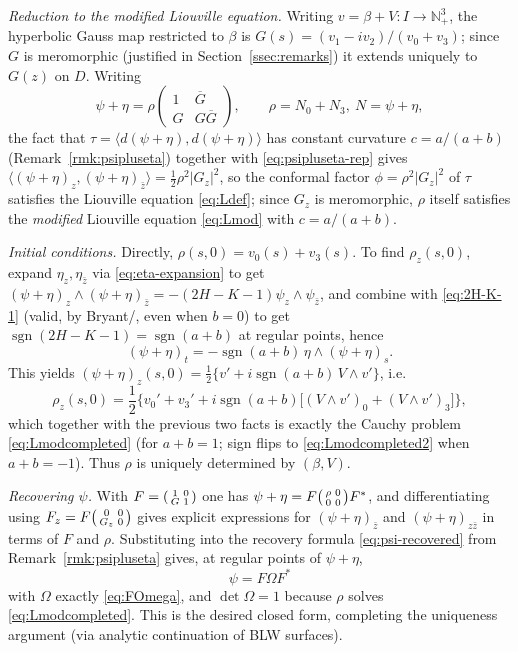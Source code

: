 \documentclass[11pt,a4paper]{article}
\newcommand{\LCone}{\mathbb{N}^3_+}                  %
\newcommand{\ip}[2]{\langle #1,#2\rangle}            %
\newcommand{\sgn}{\operatorname{sgn}}
\theoremstyle{plain}
\theoremstyle{definition}
\theoremstyle{remark}
\begin{document}
\emph{Reduction to the modified Liouville equation.} Writing
$v=\beta+V:I\to\LCone$, the hyperbolic Gauss map restricted to $\beta$ is
$G(s)=(v_1-iv_2)/(v_0+v_3)$; since $G$ is meromorphic (justified in
Section~\ref{ssec:remarks}) it extends uniquely to $G(z)$ on $D$. Writing
\begin{equation}\label{eq:psipluseta-rep}
  \psi+\eta = \rho\begin{pmatrix}1&\overline G\\ G&G\overline G\end{pmatrix},
  \qquad \rho=N_0+N_3,\ N=\psi+\eta,
\end{equation}
the fact that $\tau=\ip{d(\psi+\eta)}{d(\psi+\eta)}$ has constant
curvature $c=a/(a+b)$ (Remark~\ref{rmk:psipluseta}) together with
\eqref{eq:psipluseta-rep} gives $\ip{(\psi+\eta)_z}{(\psi+\eta)_{\bar z}}
=\tfrac12\rho^2|G_z|^2$, so the conformal factor $\phi=\rho^2|G_z|^2$ of
$\tau$ satisfies the Liouville equation \eqref{eq:Ldef}; since $G_z$ is
meromorphic, $\rho$ itself satisfies the \emph{modified} Liouville
equation \eqref{eq:Lmod} with $c=a/(a+b)$.

\emph{Initial conditions.} Directly, $\rho(s,0)=v_0(s)+v_3(s)$. To find
$\rho_z(s,0)$, expand $\eta_z,\eta_{\bar z}$ via \eqref{eq:eta-expansion}
to get $(\psi+\eta)_z\wedge(\psi+\eta)_{\bar z}=-(2H-K-1)\psi_z\wedge\psi_{\bar z}$,
and combine with \eqref{eq:2H-K-1} (valid, by Bryant/\cite{GMM1}, even when
$b=0$) to get $\sgn(2H-K-1)=\sgn(a+b)$ at regular points, hence
\[
  (\psi+\eta)_t = -\sgn(a+b)\,\eta\wedge(\psi+\eta)_s.
\]
This yields $(\psi+\eta)_z(s,0)=\tfrac12\{v'+i\sgn(a+b)\,V\wedge v'\}$, i.e.
\begin{equation}\label{eq:rhoz-init}
  \rho_z(s,0) = \frac12\Big\{v_0'+v_3'
    + i\sgn(a+b)\big[(V\wedge v')_0+(V\wedge v')_3\big]\Big\},
\end{equation}
which together with the previous two facts is exactly the Cauchy problem
\eqref{eq:Lmodcompleted} (for $a+b=1$; sign flips to
\eqref{eq:Lmodcompleted2} when $a+b=-1$). Thus $\rho$ is uniquely
determined by $(\beta,V)$.

\emph{Recovering $\psi$.} With $F=\begin{psmallmatrix}1&0\\G&1\end{psmallmatrix}$
one has $\psi+\eta=F\begin{psmallmatrix}\rho&0\\0&0\end{psmallmatrix}F^*$,
and differentiating using $F_z=F\begin{psmallmatrix}0&0\\G_z&0\end{psmallmatrix}$
gives explicit expressions for $(\psi+\eta)_{\bar z}$ and
$(\psi+\eta)_{z\bar z}$ in terms of $F$ and $\rho$. Substituting into the
recovery formula \eqref{eq:psi-recovered} from Remark~\ref{rmk:psipluseta}
gives, at regular points of $\psi+\eta$,
\[
  \psi = F\Omega F^*
\]
with $\Omega$ exactly \eqref{eq:FOmega}, and $\det\Omega=1$ because $\rho$
solves \eqref{eq:Lmodcompleted}. This is the desired closed form,
completing the uniqueness argument (via analytic continuation of BLW
surfaces).
\end{document}
